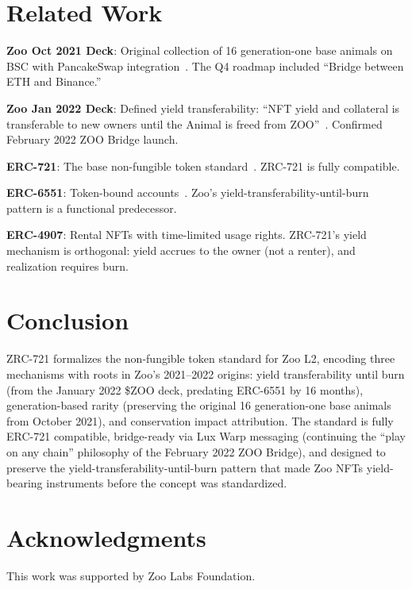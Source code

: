 \documentclass[11pt,letterpaper]{article}
\begin{document}
\section{Related Work}

\textbf{Zoo Oct 2021 Deck}: Original collection of 16 generation-one base animals on BSC with PancakeSwap integration~\cite{zoo-oct-2021-deck}. The Q4 roadmap included ``Bridge between ETH and Binance.''

\textbf{Zoo Jan 2022 Deck}: Defined yield transferability: ``NFT yield and collateral is transferable to new owners until the Animal is freed from ZOO''~\cite{zoo-jan-2022-deck}. Confirmed February 2022 ZOO Bridge launch.

\textbf{ERC-721}: The base non-fungible token standard~\cite{erc-721}. ZRC-721 is fully compatible.

\textbf{ERC-6551}: Token-bound accounts~\cite{erc-6551}. Zoo's yield-transferability-until-burn pattern is a functional predecessor.

\textbf{ERC-4907}: Rental NFTs with time-limited usage rights. ZRC-721's yield mechanism is orthogonal: yield accrues to the owner (not a renter), and realization requires burn.

\section{Conclusion}

ZRC-721 formalizes the non-fungible token standard for Zoo L2, encoding three mechanisms with roots in Zoo's 2021--2022 origins: yield transferability until burn (from the January 2022 \$ZOO deck, predating ERC-6551 by 16 months), generation-based rarity (preserving the original 16 generation-one base animals from October 2021), and conservation impact attribution. The standard is fully ERC-721 compatible, bridge-ready via Lux Warp messaging (continuing the ``play on any chain'' philosophy of the February 2022 ZOO Bridge), and designed to preserve the yield-transferability-until-burn pattern that made Zoo NFTs yield-bearing instruments before the concept was standardized.

\section*{Acknowledgments}

This work was supported by Zoo Labs Foundation.
\end{document}
